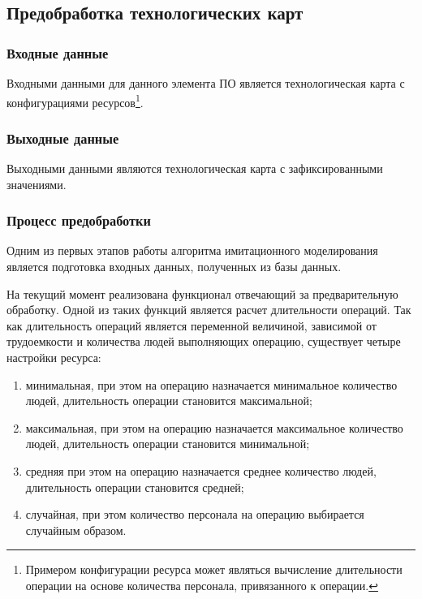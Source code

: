 \subsection{Предобработка технологических карт}

\subsubsection*{Входные данные}
\indent Входными данными для данного элемента ПО является технологическая карта с конфигурациями ресурсов\footnote{Примером конфигурации ресурса может являться вычисление длительности операции на основе количества персонала, привязанного к операции.}. 

\subsubsection*{Выходные данные}
Выходными данными являются технологическая карта с зафиксированными значениями.

\subsubsection*{Процесс предобработки}
\label{prepeocess}
Одним из первых этапов работы алгоритма имитационного моделирования является подготовка входных данных, полученных из базы данных. 

На текущий момент реализована функционал отвечающий за предварительную обработку. Одной из таких функций является расчет длительности операций. Так как длительность операций является переменной величиной, зависимой от трудоемкости и количества людей выполняющих операцию, существует четыре настройки ресурса:

\begin{enumerate}
    \item[1)] минимальная, при этом на операцию назначается минимальное количество людей, длительность операции становится максимальной;
    \item[2)] максимальная, при этом на операцию назначается максимальное количество людей, длительность операции становится минимальной;
    \item[3)] средняя при этом на операцию назначается среднее количество людей, длительность операции становится средней;
    \item[4)] случайная, при этом количество персонала на операцию выбирается случайным образом. 
\end{enumerate}


